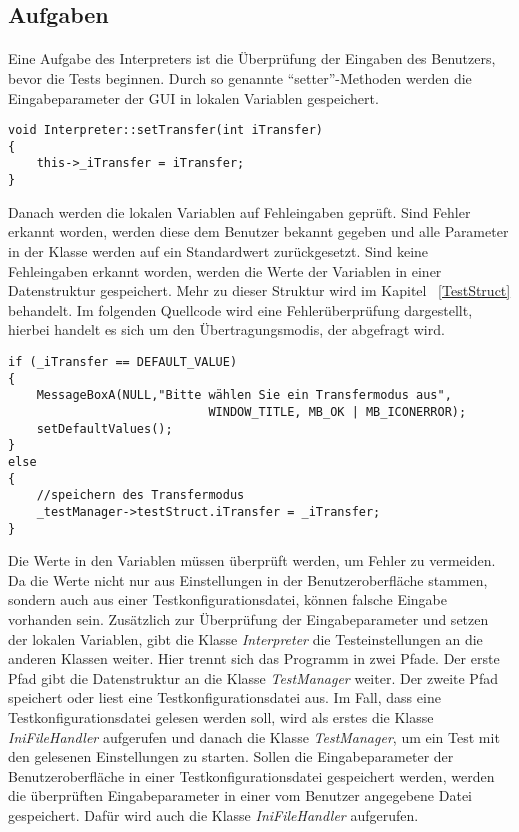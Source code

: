 \subsection{Aufgaben}
\paragraph{}
Eine Aufgabe des Interpreters ist die Überprüfung der Eingaben des Benutzers, bevor die Tests beginnen. Durch so genannte "`setter"'-Methoden werden die Eingabeparameter der GUI in lokalen Variablen gespeichert.\\


\begin{lstlisting}	 
void Interpreter::setTransfer(int iTransfer)
{
	this->_iTransfer = iTransfer;
}
\end{lstlisting}

Danach werden die lokalen Variablen auf Fehleingaben geprüft. Sind Fehler erkannt worden, werden diese dem Benutzer bekannt gegeben und alle Parameter in der Klasse werden auf ein Standardwert zurückgesetzt. Sind keine Fehleingaben erkannt worden, werden die Werte der Variablen in einer Datenstruktur gespeichert. Mehr zu dieser Struktur wird im Kapitel ~\ref{TestStruct} behandelt. Im folgenden Quellcode wird eine Fehlerüberprüfung dargestellt, hierbei handelt es sich um den Übertragungsmodis, der abgefragt wird.

\begin{lstlisting}	 
if (_iTransfer == DEFAULT_VALUE)
{
	MessageBoxA(NULL,"Bitte wählen Sie ein Transfermodus aus",
							WINDOW_TITLE, MB_OK | MB_ICONERROR);
	setDefaultValues();
}
else
{
	//speichern des Transfermodus
	_testManager->testStruct.iTransfer = _iTransfer;
}
\end{lstlisting}

Die Werte in den Variablen müssen überprüft werden, um Fehler zu vermeiden. Da die Werte nicht nur aus Einstellungen in der Benutzeroberfläche stammen, sondern auch aus einer Testkonfigurationsdatei, können falsche Eingabe vorhanden sein. Zusätzlich zur Überprüfung der Eingabeparameter und setzen der lokalen Variablen, gibt die Klasse \textit{Interpreter} die Testeinstellungen an die anderen Klassen weiter. Hier trennt sich das Programm in zwei Pfade. Der erste Pfad gibt die Datenstruktur an die Klasse \textit{TestManager} weiter. Der zweite Pfad speichert oder liest eine Testkonfigurationsdatei aus. Im Fall, dass eine Testkonfigurationsdatei gelesen werden soll, wird als erstes die Klasse \textit{IniFileHandler} aufgerufen und danach die Klasse \textit{TestManager}, um ein Test mit den gelesenen Einstellungen zu starten. Sollen die Eingabeparameter der Benutzeroberfläche in einer Testkonfigurationsdatei gespeichert werden, werden die überprüften Eingabeparameter in einer vom Benutzer angegebene Datei gespeichert. Dafür wird auch die Klasse \textit{IniFileHandler} aufgerufen.\\

